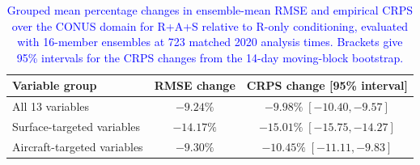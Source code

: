 \begin{table}[tbp]
\centering
\caption{\textcolor{blue}{Grouped mean percentage changes in ensemble-mean
RMSE and empirical CRPS over the CONUS domain for R+A+S relative to R-only
conditioning, evaluated with 16-member ensembles at 723 matched 2020 analysis
times. Brackets give 95\% intervals for the CRPS changes from the 14-day
moving-block bootstrap.}}
\label{tab:frozen2019_probabilistic}
\small
\renewcommand{\arraystretch}{1.22}
\begin{tabular*}{\textwidth}{@{\extracolsep{\fill}}lcc@{}}
\toprule
Variable group & RMSE change & CRPS change [95\% interval] \\
\midrule
All 13 variables
& $-9.24\%$ & $-9.98\%\;[-10.40,-9.57]$ \\
Surface-targeted variables
& $-14.17\%$ & $-15.01\%\;[-15.75,-14.27]$ \\
Aircraft-targeted variables
& $-9.30\%$ & $-10.45\%\;[-11.11,-9.83]$ \\
\bottomrule
\end{tabular*}
\end{table}
